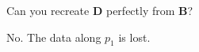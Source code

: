 Can you recreate $\boldsymbol{D}$ perfectly from $\boldsymbol{B}$?

\begin{solution}
    No. The data along $p_1$ is lost.
\end{solution}
